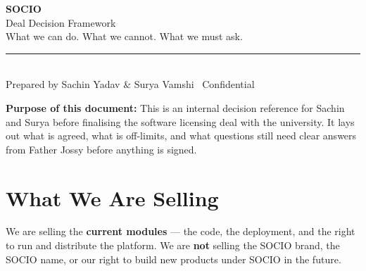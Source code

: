 \documentclass[12pt,a4paper]{article}
\begin{document}
\begin{center}
    {\fontsize{28}{36}\selectfont\bfseries\color{primary} SOCIO}\\[0.3cm]
    {\Large\color{accent} Deal Decision Framework}\\[0.2cm]
    {\normalsize\color{darkgray} What we can do. What we cannot. What we must ask.}\\[0.4cm]
    \noindent\rule{\textwidth}{1pt}\\[0.2cm]
    {\small\color{darkgray} Prepared by Sachin Yadav \& Surya Vamshi \textbullet\ Confidential \textbullet\ \the\year}
\end{center}

\vspace{0.5cm}

\begin{infobox}
\textbf{Purpose of this document:} This is an internal decision reference for Sachin and Surya before finalising the software licensing deal with the university. It lays out what is agreed, what is off-limits, and what questions still need clear answers from Father Jossy before anything is signed.
\end{infobox}

\newpage
\tableofcontents
\newpage

\section{What We Are Selling}

\begin{infobox}
We are selling the \textbf{current modules} — the code, the deployment, and the right to run and distribute the platform. We are \textbf{not} selling the SOCIO brand, the SOCIO name, or our right to build new products under SOCIO in the future.
\end{infobox}

\vspace{0.4cm}
\end{document}

